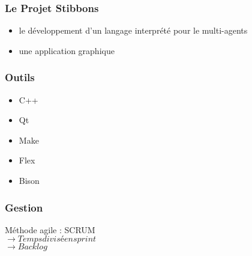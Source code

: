 \begin{frame}
\frametitle{Le Projet Stibbons}
\begin{itemize}
\item le développement d'un langage interprété pour le multi-agents
\item une application graphique 
\end{itemize}
\end{frame}

\begin{frame}
\frametitle{Outils}
\begin{itemize}
\item C++
\item Qt
\item Make
\item Flex 
\item Bison
\end{itemize}
\end{frame}

\begin{frame}
\frametitle{Gestion}
Méthode agile : SCRUM\\
$\rightarrow Temps divisé en sprint$\\
$\rightarrow Backlog$
\end{frame}